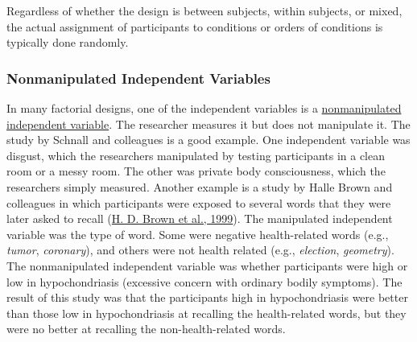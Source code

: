 \documentclass[
]{krantz}
\begin{document}
Regardless of whether the design is between subjects, within subjects, or mixed, the actual assignment of participants to conditions or orders of conditions is typically done randomly.

\hypertarget{nonmanipulated-independent-variables}{%
\subsubsection*{Nonmanipulated Independent Variables}\label{nonmanipulated-independent-variables}}


In many factorial designs, one of the independent variables is a \protect\hyperlink{nonmanipulated-independent-variable}{nonmanipulated independent variable}. The researcher measures it but does not manipulate it. The study by Schnall and colleagues is a good example. One independent variable was disgust, which the researchers manipulated by testing participants in a clean room or a messy room. The other was private body consciousness, which the researchers simply measured. Another example is a study by Halle Brown and colleagues in which participants were exposed to several words that they were later asked to recall (\protect\hyperlink{ref-brown1999perceptual}{H. D. Brown et al., 1999}). The manipulated independent variable was the type of word. Some were negative health-related words (e.g., \emph{tumor}, \emph{coronary}), and others were not health related (e.g., \emph{election}, \emph{geometry}). The nonmanipulated independent variable was whether participants were high or low in hypochondriasis (excessive concern with ordinary bodily symptoms). The result of this study was that the participants high in hypochondriasis were better than those low in hypochondriasis at recalling the health-related words, but they were no better at recalling the non-health-related words.
\end{document}
